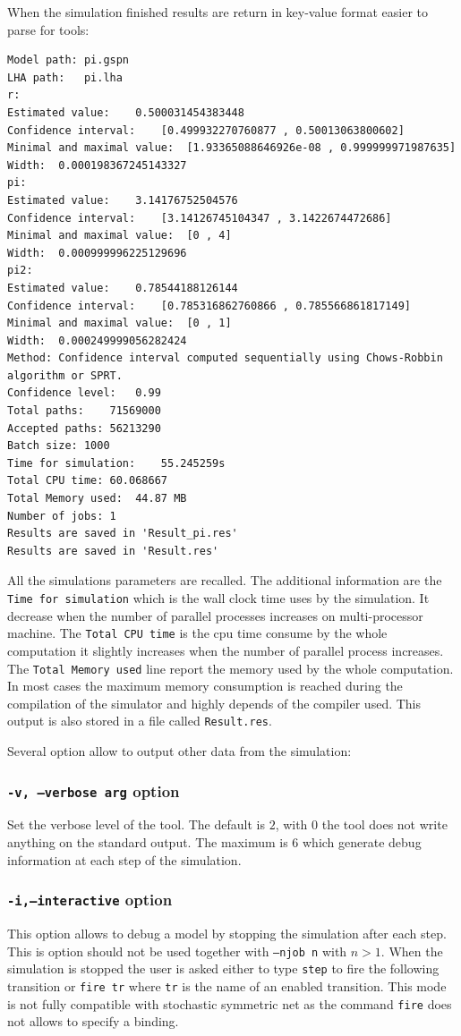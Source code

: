 \documentclass{article}
\begin{document}
When the simulation finished results are return in key-value format
easier to parse for tools:
\begin{scriptsize}
\begin{verbatim}
Model path:	pi.gspn
LHA path:	pi.lha
r:
Estimated value:	0.500031454383448
Confidence interval:	[0.499932270760877 , 0.50013063800602]
Minimal and maximal value:	[1.93365088646926e-08 , 0.999999971987635]
Width:	0.000198367245143327
pi:
Estimated value:	3.14176752504576
Confidence interval:	[3.14126745104347 , 3.1422674472686]
Minimal and maximal value:	[0 , 4]
Width:	0.000999996225129696
pi2:
Estimated value:	0.78544188126144
Confidence interval:	[0.785316862760866 , 0.785566861817149]
Minimal and maximal value:	[0 , 1]
Width:	0.000249999056282424
Method:	Confidence interval computed sequentially using Chows-Robbin algorithm or SPRT.
Confidence level:	0.99
Total paths:	71569000
Accepted paths:	56213290
Batch size:	1000
Time for simulation:	55.245259s
Total CPU time:	60.068667
Total Memory used:	44.87 MB
Number of jobs:	1
Results are saved in 'Result_pi.res'
Results are saved in 'Result.res'
\end{verbatim}
\end{scriptsize}
All the simulations parameters are recalled. The additional
information are the \texttt{Time for simulation} which is the wall
clock time uses by the simulation.  It decrease when the number of
parallel processes increases on multi-processor machine.  The
\texttt{Total CPU time} is the cpu time consume by the whole
computation it slightly increases when the number of parallel process
increases. The \texttt{Total Memory used} line report the memory used
by the whole computation. In most cases the maximum memory consumption
is reached during the compilation of the simulator and highly depends of
the compiler used. This output is also stored in a file called \texttt{Result.res}.

Several option allow to output other data from the simulation:

\subsubsection{\texttt{-v, --verbose arg} option}
Set the verbose level of the tool. The default is $2$, with $0$ the tool
does not write anything on the standard output. The maximum is $6$ which 
generate debug information at each step of the simulation.

\subsubsection{\texttt{-i,--interactive} option}
This option allows to debug a model by stopping the simulation after
each step.  This is option should not be used together with
\texttt{--njob n} with $n>1$.  When the simulation is stopped the user
is asked either to type \texttt{step} to fire the following transition
or \texttt{fire tr} where \texttt{tr} is the name of an enabled
transition. This mode is not fully compatible with stochastic
symmetric net as the command \texttt{fire} does not allows to specify
a binding.
\end{document}
